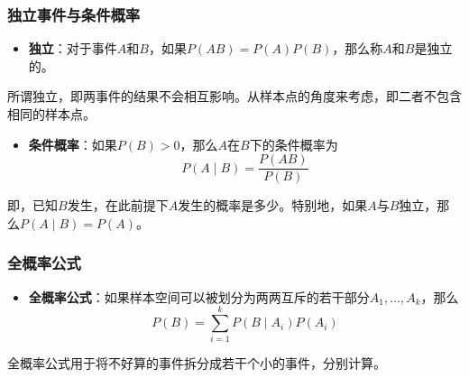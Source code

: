 \documentclass[9pt,dvipsnames]{beamer}
\begin{document}
\begin{frame}
	\frametitle{独立事件与条件概率}
	\begin{itemize}
		\item \textbf{独立}：对于事件$A$和$B$，如果$P(AB)=P(A)P(B)$，那么称$A$和$B$是独立的。
	\end{itemize}
	所谓独立，即两事件的结果不会相互影响。从样本点的角度来考虑，即二者不包含相同的样本点。

	\begin{itemize}
		\item \textbf{条件概率}：如果$P(B)>0$，那么$A$在$B$下的条件概率为
			\[ P(A\mid B) = \frac{P(AB)}{P(B)} \]
	\end{itemize}
	\vspace{-1em}
	即，已知$B$发生，在此前提下$A$发生的概率是多少。特别地，如果$A$与$B$独立，那么$P(A\mid B)=P(A)$。
\end{frame}
\begin{frame}
	\frametitle{全概率公式}
	\begin{itemize}
		\item \textbf{全概率公式}：如果样本空间可以被划分为两两互斥的若干部分$A_1,\ldots,A_k$，那么
			\[ P(B) = \sum_{i=1}^{k}P(B\mid A_i)P(A_i) \]
	\end{itemize}
	全概率公式用于将不好算的事件拆分成若干个小的事件，分别计算。
\end{frame}
\end{document}
